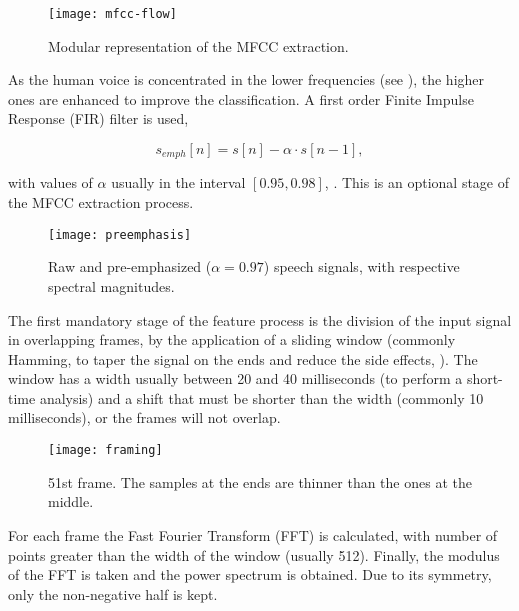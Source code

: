 \begin{figure}[ht]
    \centering
    \texttt{[image: mfcc-flow]}
    \caption{Modular representation of the MFCC extraction.}
    \label{fig:mfcc-flow}
\end{figure}


As the human voice is concentrated in the lower frequencies (see ), the higher ones are enhanced to improve the classification. A first order Finite Impulse Response (FIR) filter is used,

\begin{equation}
    s_{emph}[n] = s[n] - \alpha \cdot s[n - 1],
    \label{eq:preemphasis}
\end{equation}

\noindent with values of $\alpha$ usually in the interval $[0.95, 0.98]$, . This is an optional stage of the MFCC extraction process.

\begin{figure}[ht]
    \centering
    \texttt{[image: preemphasis]}
    \caption{Raw and pre-emphasized ($\alpha = 0.97$) speech signals, with respective spectral magnitudes.}
    \label{fig:preemphasis}
\end{figure}


The first mandatory stage of the feature process is the division of the input signal in overlapping frames, by the application of a sliding window (commonly Hamming, to taper the signal on the ends and reduce the side effects, ). The window has a width usually between 20 and 40 milliseconds (to perform a short-time analysis) and a shift that must be shorter than the width (commonly 10 milliseconds), or the frames will not overlap.

\begin{figure}[ht]
    \centering
    \texttt{[image: framing]}
    \caption{51st frame. The samples at the ends are thinner than the ones at the middle.}
    \label{fig:framing}
\end{figure}


For each frame the Fast Fourier Transform (FFT) is calculated, with number of points greater than the width of the window (usually 512). Finally, the modulus of the FFT is taken and the power spectrum is obtained. Due to its symmetry, only the non-negative half is kept.

